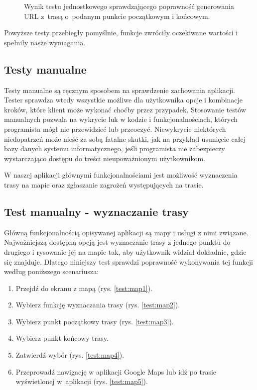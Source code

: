 \setlength{\fboxrule}{0.5pt}
\begin{figure}[H]
    \centering
    \caption{Wynik testu jednostkowego sprawdzającego poprawność generowania URL z~trasą o~podanym punkcie początkowym i końcowym.}
    \label{result:map}
\end{figure}

Powyższe testy przebiegły pomyślnie, funkcje zwróciły oczekiwane wartości i spełniły nasze wymagania.

\subsection{Testy manualne}
Testy manualne są ręcznym sposobem na sprawdzenie zachowania aplikacji. Tester sprawdza wtedy wszystkie możliwe dla użytkownika opcje i kombinacje kroków, które klient może wykonać choćby przez przypadek. Stosowanie testów manualnych pozwala na wykrycie luk w kodzie i funkcjonalnościach, których programista mógł nie przewidzieć lub przeoczyć. Niewykrycie niektórych niedopatrzeń może nieść za sobą fatalne skutki, jak na przykład usunięcie całej bazy danych systemu informatycznego, jeśli programista nie zabezpieczy wystarczająco dostępu do treści nieupoważnionym użytkownikom.\par
W naszej aplikacji głównymi funkcjonalnościami jest możliwość wyznaczenia trasy na mapie oraz zgłaszanie zagrożeń występujących na trasie.
\subsection*{Test manualny - wyznaczanie trasy}
Główną funkcjonalnością opisywanej aplikacji są mapy i usługi z nimi związane. Najważniejszą dostępną opcją jest wyznaczanie trasy z jednego punktu do drugiego i rysowanie jej na mapie tak, aby użytkownik widział dokładnie, gdzie się znajduje. Dlatego niniejszy test sprawdzi poprawność wykonywania tej funkcji według poniższego scenariusza:
\begin{enumerate}
    \item Przejdź do ekranu z mapą (rys. \ref{test:map1}).
    \item Wybierz funkcję wyznaczania trasy (rys. \ref{test:map2}).
    \item Wybierz punkt początkowy trasy (rys. \ref{test:map3}).
    \item Wybierz punkt końcowy trasy.
    \item Zatwierdź wybór (rys. \ref{test:map4}).
    \item Przeprowadź nawigację w aplikacji Google Maps lub idź po trasie wyświetlonej w~aplikacji (rys. \ref{test:map5}).
\end{enumerate}

